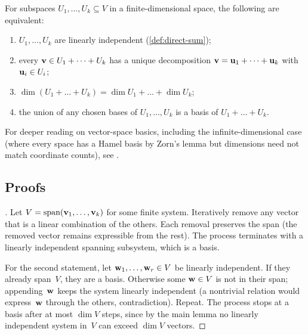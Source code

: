 \begin{theorem}
\label{thm:direct-sum-equiv}
For subspaces $U_1, \dots, U_k \subseteq V$ in a finite-dimensional
space, the following are equivalent:
\begin{enumerate}[label=(\alph*)]
  \item $U_1, \dots, U_k$ are linearly independent (\cref{def:direct-sum});
  \item every $\mathbf{v} \in U_1 + \dots + U_k$ has a unique
        decomposition $\mathbf{v} = \mathbf{u}_1 + \dots + \mathbf{u}_k$
        with $\mathbf{u}_i \in U_i$;
  \item $\dim(U_1 + \dots + U_k) = \dim U_1 + \dots + \dim U_k$;
  \item the union of any chosen bases of $U_1, \dots, U_k$ is a basis of
        $U_1 + \dots + U_k$.
\end{enumerate}
\end{theorem}

\begin{remark}
For deeper reading on vector-space basics, including the
infinite-dimensional case (where every space has a Hamel basis by Zorn's
lemma but dimensions need not match coordinate counts), see
\cite{Beklemishev2025}.
\end{remark}

\subsection*{Proofs}

\begin{proof}[]
Let $V = \operatorname{span}(\mathbf{v}_1, \dots, \mathbf{v}_k)$ for some finite system.
Iteratively remove any vector that is a linear combination of the
others. Each removal preserves the span (the removed vector remains
expressible from the rest). The process terminates with a linearly
independent spanning subsystem, which is a basis.

For the second statement, let $\mathbf{w}_1, \dots, \mathbf{w}_r \in V$ be
linearly independent. If they already span~$V$, they are a basis.
Otherwise some $\mathbf{w} \in V$ is not in their span; appending~$\mathbf{w}$
keeps the system linearly independent (a nontrivial relation would
express~$\mathbf{w}$ through the others, contradiction). Repeat. The
process stops at a basis after at most $\dim V$ steps, since by the
main lemma no linearly independent system in~$V$ can exceed
$\dim V$ vectors.
\end{proof}

